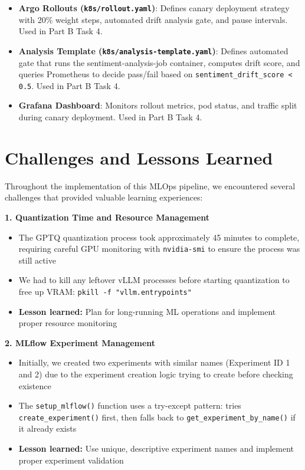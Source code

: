 \documentclass[11pt,a4paper]{article}
\begin{document}
\begin{itemize}
\item \textbf{Argo Rollouts (\texttt{k8s/rollout.yaml})}: Defines canary deployment strategy with 20\% weight steps, automated drift analysis gate, and pause intervals. Used in Part B Task 4.

\item \textbf{Analysis Template (\texttt{k8s/analysis-template.yaml})}: Defines automated gate that runs the sentiment-analysis-job container, computes drift score, and queries Prometheus to decide pass/fail based on \texttt{sentiment\_drift\_score < 0.5}. Used in Part B Task 4.

\item \textbf{Grafana Dashboard}: Monitors rollout metrics, pod status, and traffic split during canary deployment. Used in Part B Task 4.
\end{itemize}

\newpage

\section{Challenges and Lessons Learned}
\label{sec:challenges}

Throughout the implementation of this MLOps pipeline, we encountered several challenges that provided valuable learning experiences:

\textbf{1. Quantization Time and Resource Management}
\begin{itemize}
\item The GPTQ quantization process took approximately 45 minutes to complete, requiring careful GPU monitoring with \texttt{nvidia-smi} to ensure the process was still active
\item We had to kill any leftover vLLM processes before starting quantization to free up VRAM: \texttt{pkill -f "vllm.entrypoints"}
\item \textbf{Lesson learned:} Plan for long-running ML operations and implement proper resource monitoring
\end{itemize}

\textbf{2. MLflow Experiment Management}
\begin{itemize}
\item Initially, we created two experiments with similar names (Experiment ID 1 and 2) due to the experiment creation logic trying to create before checking existence
\item The \texttt{setup\_mlflow()} function uses a try-except pattern: tries \texttt{create\_experiment()} first, then falls back to \texttt{get\_experiment\_by\_name()} if it already exists
\item \textbf{Lesson learned:} Use unique, descriptive experiment names and implement proper experiment validation
\end{itemize}
\end{document}

